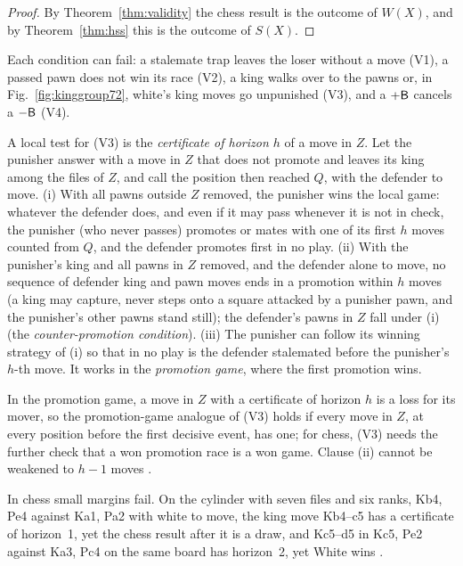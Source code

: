 \begin{proof}
By Theorem~\ref{thm:validity} the chess result is the outcome of $W(X)$, and by Theorem~\ref{thm:hss} this is
the outcome of $S(X)$.
\end{proof}

Each condition can fail: a stalemate trap leaves the loser without a move (V1), a passed pawn does not win its
race (V2), a king walks over to the pawns or, in Fig.~\ref{fig:kinggroup72}, white's king moves go unpunished
(V3), and a $+\mathsf{B}$ cancels a $-\mathsf{B}$ (V4).

A local test for (V3) is the \emph{certificate of horizon $h$} of a move in $Z$. Let the punisher answer with a move in $Z$ that does not promote and leaves its king among
the files of $Z$, and call the position then reached $Q$, with the defender to move. (i) With all pawns outside $Z$ removed, the punisher wins the local game: whatever the defender does, and
even if it may pass whenever it is not in check, the punisher (who never passes) promotes or mates with one of its first $h$ moves counted from $Q$, and the defender promotes first
in no play. (ii) With the punisher's king and all pawns in $Z$ removed, and the defender alone to move, no sequence of defender king and pawn moves ends in a promotion within $h$
moves (a king may capture, never steps onto a square attacked by a punisher pawn, and the punisher's other pawns stand still); the defender's pawns in $Z$ fall under (i) (the \emph{counter-promotion condition}). (iii)
The punisher can follow its winning strategy of (i) so that in no play is the defender stalemated before the punisher's $h$-th move. It works in the \emph{promotion game}, where the first promotion wins.

\begin{theorem}[\lab{S}]\label{thm:cert}
In the promotion game, a move in $Z$ with a certificate of horizon $h$ is a loss for its mover, so the
promotion-game analogue of (V3) holds if every move in $Z$, at every position before the first decisive event, has one; for chess, (V3) needs the further
check that a won promotion race is a won game. Clause (ii) cannot be weakened to $h-1$ moves .
\end{theorem}

In chess small margins fail. On the cylinder with seven files and six ranks, Kb4, Pe4 against Ka1, Pa2 with
white to move, the king move Kb4--c5 has a certificate of horizon~1, yet the chess result after it is a draw, and
Kc5--d5 in Kc5, Pe2 against Ka3, Pc4 on the same board has horizon~2, yet White wins .

